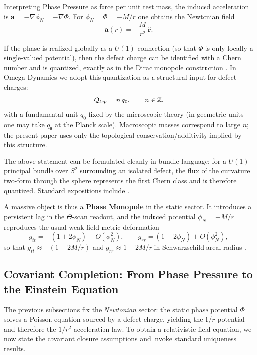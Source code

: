 \begin{proposition}
Interpreting Phase Pressure as force per unit test mass, the induced acceleration is $\mathbf{a}=-\nabla\phi_N=-\nabla\Phi$. For $\phi_N=\Phi=-M/r$ one obtains the Newtonian field
\begin{equation}
  \mathbf{a}(r)= -\frac{M}{r^2}\,\hat{\mathbf{r}} .
\end{equation}
\end{proposition}

\begin{remark}
If the phase is realized globally as a $U(1)$ connection (so that $\Phi$ is only locally a single-valued potential), then the defect charge can be identified with a Chern number and is quantized, exactly as in the Dirac monopole construction \cite{Dirac1931, WuYang1975}. In Omega Dynamics we adopt this quantization as a structural input for defect charges:
\begin{equation}
  \mathcal{Q}_{top}=n\,q_0,\qquad n\in\mathbb{Z},
\end{equation}
with a fundamental unit $q_0$ fixed by the microscopic theory (in geometric units one may take $q_0$ at the Planck scale). Macroscopic masses correspond to large $n$; the present paper uses only the topological conservation/additivity implied by this structure.
\end{remark}

\begin{remark}
The above statement can be formulated cleanly in bundle language: for a $U(1)$ principal bundle over $S^2$ surrounding an isolated defect, the flux of the curvature two-form through the sphere represents the first Chern class and is therefore quantized. Standard expositions include \cite{Nakahara2003}.
\end{remark}

A massive object is thus a \textbf{Phase Monopole} in the static sector. It introduces a persistent lag in the $\Theta$-scan readout, and the induced potential $\phi_N=-M/r$ reproduces the usual weak-field metric deformation
\begin{equation}
  g_{tt}=-(1+2\phi_N)+O(\phi_N^2),\qquad
  g_{rr}=(1-2\phi_N)+O(\phi_N^2),
\end{equation}
so that $g_{tt}\approx -(1-2M/r)$ and $g_{rr}\approx 1+2M/r$ in Schwarzschild areal radius \cite{Wald1984}.

\subsection{Covariant Completion: From Phase Pressure to the Einstein Equation}
\label{sec:covariant_completion}
The previous subsections fix the \emph{Newtonian} sector: the static phase potential $\Phi$ solves a Poisson equation sourced by a defect charge, yielding the $1/r$ potential and therefore the $1/r^2$ acceleration law. To obtain a relativistic field equation, we now state the covariant closure assumptions and invoke standard uniqueness results.

